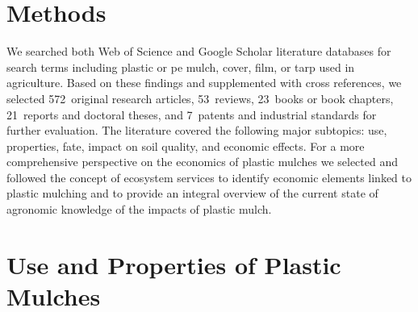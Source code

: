 \section{Methods}
\label{sec:plastic-mulching:methods}

We searched both Web of Science and Google Scholar literature databases for search terms including plastic or \ac{pe} mulch, cover, film, or tarp used in agriculture. Based on these findings and supplemented with cross references, we selected \num{572}~original research articles, \num{53}~reviews, \num{23}~books or book chapters, \num{21}~reports and doctoral theses, and \num{7}~patents and industrial standards for further evaluation. The literature covered the following major subtopics: use, properties, fate, impact on soil quality, and economic effects. For a more comprehensive perspective on the economics of plastic mulches we selected and followed the concept of ecosystem services \citep{MillenniumEcosystemAssessmentEcosystems2005} to identify economic elements linked to plastic mulching and to provide an integral overview of the current state of agronomic knowledge of the impacts of plastic mulch.

\section{Use and Properties of Plastic Mulches}
\label{sec:plastic-mulching:use-and-properties}

